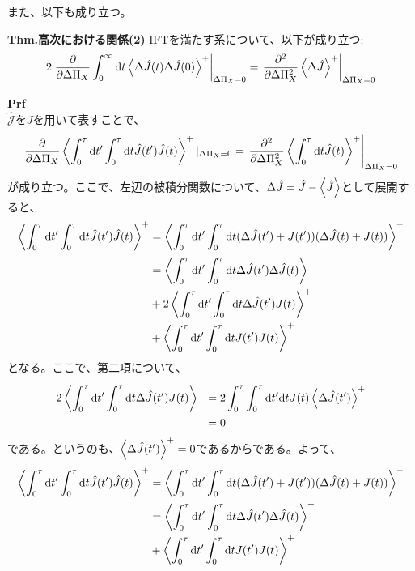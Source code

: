 \documentclass[a4paper,11pt]{jsarticle}
\begin{document}
また、以下も成り立つ。
\begin{itembox}[l]{\textbf{Thm.高次における関係(2)}}
    IFTを満たす系について、以下が成り立つ:
    \begin{align}
        2\left.\pdv{\Delta \Pi_X} \int_0 ^{\infty} \dd t \ev{\Delta \hat{J}(t) \Delta \hat{J}(0)}^+\right|_{\Delta \Pi_X = 0} = \left.\pdv[2]{\Delta \Pi_X} \ev{\Delta \hat{J}}^+\right|_{\Delta \Pi_X = 0}
    \end{align}
\end{itembox}
\textbf{Prf}\\
$\hat{\mathcal{J}}$を$J$を用いて表すことで、
\begin{align}
    \pdv{\Delta \Pi_X} \ev{\int_0 ^{\tau} \dd t' \int_0 ^{\tau} \dd t \hat{J}(t')\hat{J}(t)}^+|_{\Delta \Pi_X = 0} = \left.\pdv[2]{\Delta \Pi_X} \ev{\int_0 ^{\tau} \dd t \hat{J}(t)}^+\right|_{\Delta \Pi_X = 0}
\end{align}
が成り立つ。ここで、左辺の被積分関数について、$\Delta \hat{J} = \hat{J} - \ev{\hat{J}}$として展開すると、
\begin{align}
    \ev{\int_0 ^{\tau} \dd t' \int_0 ^{\tau} \dd t \hat{J}(t')\hat{J}(t)}^+ &= \ev{\int_0 ^{\tau} \dd t' \int_0 ^{\tau} \dd t (\Delta \hat{J}(t') +{J}(t'))(\Delta \hat{J}(t) +{J}(t))}^+\\
    &= \ev{\int_0 ^{\tau} \dd t' \int_0 ^{\tau} \dd t \Delta \hat{J}(t')\Delta \hat{J}(t)}^+ \\
    &+ 2\ev{\int_0 ^{\tau} \dd t' \int_0 ^{\tau} \dd t \Delta \hat{J}(t'){J}(t)}^+\\
    &+ \ev{\int_0 ^{\tau} \dd t' \int_0 ^{\tau} \dd t {J}(t') {J}(t)}^+
\end{align}
となる。ここで、第二項について、
\begin{align}
    2\ev{\int_0 ^{\tau} \dd t' \int_0 ^{\tau} \dd t \Delta \hat{J}(t') {J}(t)}^+ &= 2\int_0 ^{\tau} \int_0 ^{\tau} \dd t' \dd t J(t) \ev{\Delta \hat{J}(t')}^+\\
    &= 0
\end{align}
である。というのも、$\ev{\Delta \hat{J}(t')}^+ = 0$であるからである。よって、
\begin{align}
    \ev{\int_0 ^{\tau} \dd t' \int_0 ^{\tau} \dd t \hat{J}(t')\hat{J}(t)}^+ &= \ev{\int_0 ^{\tau} \dd t' \int_0 ^{\tau} \dd t (\Delta \hat{J}(t') +{J}(t'))(\Delta \hat{J}(t) +{J}(t))}^+\\
    &= \ev{\int_0 ^{\tau} \dd t' \int_0 ^{\tau} \dd t \Delta \hat{J}(t')\Delta \hat{J}(t)}^+ \\
    &+ \ev{\int_0 ^{\tau} \dd t' \int_0 ^{\tau} \dd t {J}(t'){J}(t)}^+
\end{align}
\end{document}
